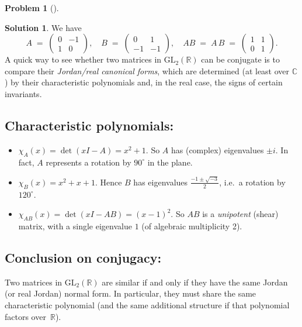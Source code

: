 \documentclass[12pt]{article}
\theoremstyle{definition} %
\newtheorem{solution}{Solution}
\newtheorem{problem}{Problem}
\theoremstyle{plain} %
\begin{document}
\begin{problem}[]
    
\end{problem}
\begin{solution}
    We have 
\[
A \;=\;\begin{pmatrix} 0 & -1\\[6pt] 1 & 0 \end{pmatrix},
\quad
B \;=\;\begin{pmatrix} 0 & 1\\[6pt] -1 & -1 \end{pmatrix},
\quad
AB \;=\; A\,B 
\;=\; \begin{pmatrix} 1 & 1\\[5pt] 0 & 1 \end{pmatrix}.
\]
A quick way to see whether two matrices in \(\mathrm{GL}_2(\mathbb{R})\) can be conjugate is to compare their \emph{Jordan/real canonical forms}, which are determined (at least over \(\mathbb{C}\)) by their characteristic polynomials and, in the real case, the signs of certain invariants.  

\subsection*{Characteristic polynomials:}

\begin{itemize}
\item 
\(\chi_A(x) = \det(xI - A) = x^2 + 1.\)
So \(A\) has (complex) eigenvalues \( \pm i\).  In fact, \(A\) represents a rotation by \(90^\circ\) in the plane.

\item
\(\chi_B(x) = x^2 + x + 1.\)
Hence \(B\) has eigenvalues \(\tfrac{-1 \pm \sqrt{-3}}{2}\), i.e.\ a rotation by \(120^\circ\).  

\item
\(\chi_{AB}(x) = \det(xI - AB) = (x-1)^2.\)
So \(AB\) is a \emph{unipotent} (shear) matrix, with a single eigenvalue \(1\) (of algebraic multiplicity 2). 
\end{itemize}

\subsection*{Conclusion on conjugacy:}

Two matrices in \(\mathrm{GL}_2(\mathbb{R})\) are similar if and only if they have the same Jordan (or real Jordan) normal form.  In particular, they must share the same characteristic polynomial (and the same additional structure if that polynomial factors over~\(\mathbb{R}\)).  


\end{solution}
\end{document}

